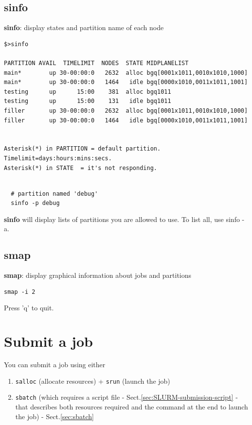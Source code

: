 \subsection{sinfo}
\label{sec:sinfo}

 {\bf sinfo}: display states and partition name of each node 

{\tiny
\begin{verbatim}
$>sinfo

PARTITION AVAIL  TIMELIMIT  NODES  STATE MIDPLANELIST
main*        up 30-00:00:0   2632  alloc bgq[0001x1011,0010x1010,1000]
main*        up 30-00:00:0   1464   idle bgq[0000x1010,0011x1011,1001]
testing      up      15:00    381  alloc bgq1011
testing      up      15:00    131   idle bgq1011
filler       up 30-00:00:0   2632  alloc bgq[0001x1011,0010x1010,1000]
filler       up 30-00:00:0   1464   idle bgq[0000x1010,0011x1011,1001]


Asterisk(*) in PARTITION = default partition. Timelimit=days:hours:mins:secs.
Asterisk(*) in STATE  = it's not responding.

\end{verbatim}
}
  
  \begin{verbatim}
  
  # partition named 'debug'
  sinfo -p debug
  \end{verbatim}
  {\bf sinfo} will display  lists of partitions you are allowed to use. To list
  all, use sinfo -a.
 
\subsection{smap}
\label{sec:smap}

{\bf smap}: display graphical information about jobs and partitions
\begin{verbatim}
smap -i 2
\end{verbatim}

Press 'q' to quit.

\section{Submit a job}
\label{sec:SLURM-job}

You can submit a job using either
\begin{enumerate}
  \item \verb!salloc! (allocate resources) + \verb!srun! (launch the job) 
  
  \item \verb!sbatch! (which requires a script file -
  Sect.\ref{sec:SLURM-submission-script} - that describes both resources
  required and the command at the end to launch the job) - Sect.\ref{sec:sbatch}  
\end{enumerate}


